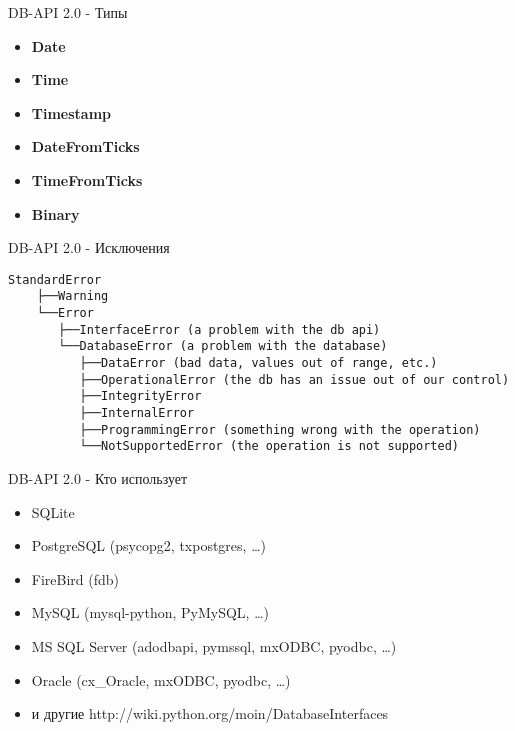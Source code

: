 \begin{frame}{DB-API 2.0 - Типы}

  \begin{itemize}

    \item \textbf{Date}
    \item \textbf{Time}
    \item \textbf{Timestamp}
    \item \textbf{DateFromTicks}
    \item \textbf{TimeFromTicks}
    \item \textbf{Binary}

  \end{itemize}

\end{frame}

\begin{frame}[fragile]{DB-API 2.0 - Исключения}

    \begin{lstlisting}[style=python]
    StandardError
    ├──Warning
    └──Error
       ├──InterfaceError (a problem with the db api)
       └──DatabaseError (a problem with the database)
          ├──DataError (bad data, values out of range, etc.)
          ├──OperationalError (the db has an issue out of our control)
          ├──IntegrityError
          ├──InternalError
          ├──ProgrammingError (something wrong with the operation)
          └──NotSupportedError (the operation is not supported)
    \end{lstlisting}

\end{frame}

\begin{frame}{DB-API 2.0 - Кто использует}

  \begin{itemize}

    \item SQLite
    \item PostgreSQL (psycopg2, txpostgres, …)
    \item FireBird (fdb)
    \item MySQL (mysql-python, PyMySQL, …)
    \item MS SQL Server (adodbapi, pymssql, mxODBC, pyodbc, …)
    \item Oracle (cx\_Oracle, mxODBC, pyodbc, …)
    \item и другие http://wiki.python.org/moin/DatabaseInterfaces

  \end{itemize}

\end{frame}


